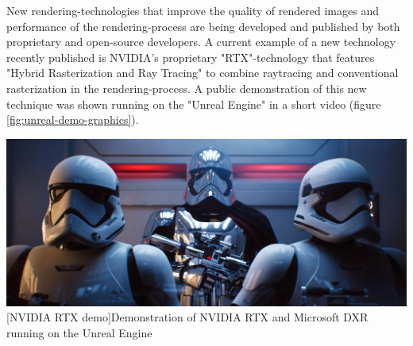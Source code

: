New rendering-technologies that improve the quality of rendered images and performance of the rendering-process are being developed and published by both proprietary and open-source developers. A current example of a new technology recently published is NVIDIA's proprietary "RTX"-technology \cite{NVIDIARTX} that features "Hybrid Rasterization and Ray Tracing" \cite{NVIDIARayTracing} to combine raytracing and conventional rasterization in the rendering-process. A public demonstration of this new technique was shown running on the "Unreal Engine" in a short video (figure \ref{fig:unreal-demo-graphics})\cite{UnrealDemoReflections}.
\begin{center}
\noindent\includegraphics[width=14cm]{img/ch05/UnrealGraphicsDemo.png}
[NVIDIA RTX demo]{Demonstration of NVIDIA RTX and Microsoft DXR running on the Unreal Engine \cite{UnrealDemoReflections}}
\label{fig:unreal-demo-graphics}
\end{center}

